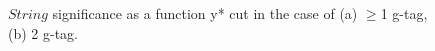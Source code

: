 \begin{figure}[htbp]
        \centering
        \caption{$String$ significance as a function y* cut in the case of (a) $\geq$1 g-tag, (b) 2 g-tag.}
        \label{fig: string significance as a function of y* cut}
\end{figure}


